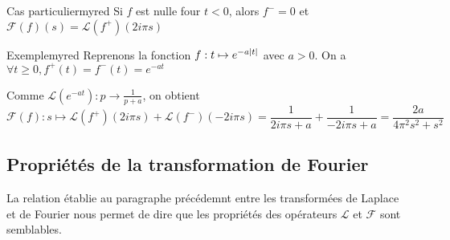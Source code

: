     \begin{omed}{Cas particulier}{myred}
        Si $f$ est nulle four $t < 0$, alors $f^-=0$ et $\mathcal{F}(f)(s) = \mathcal{L}(f^+)(2i\pi s)$
    \end{omed}

    \begin{omed}{Exemple}{myred}
        Reprenons la fonction $f : t \mapsto e^{-a\left\lvert t\right\rvert}$ avec $a > 0$. On a $\forall t \geq 0, f^+(t) = f^-(t) = e^{-at}$

        Comme $\mathcal{L}(e^{-at}) : p \rightarrow \frac{1}{p + a}$, on obtient
        \[ \mathcal{F}(f) : s \mapsto \mathcal{L}(f^+)(2i\pi s) + \mathcal{L}(f^-)(- 2 i \pi s) = \frac{1}{2i\pi s + a } + \frac{1}{ -2i\pi s + a } = \frac{2a}{4\pi^2 s^2 + s^2} \]
    \end{omed}

\subsection{Propriétés de la transformation de Fourier}

    La relation établie au paragraphe précédemnt entre les transformées de Laplace et de Fourier nous permet de dire que les propriétés des opérateurs $\mathcal{L}$ et $\mathcal{F}$ sont semblables. 

